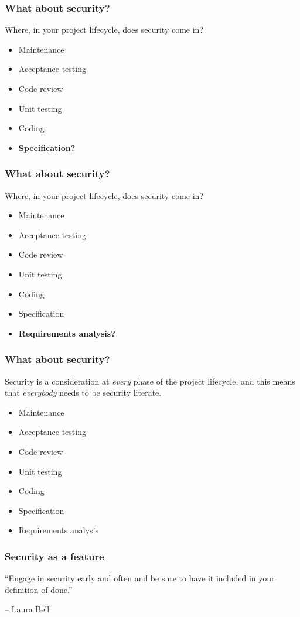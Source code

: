 \documentclass[10pt]{beamer}
\begin{document}
\begin{frame}
	\frametitle{What about security?}

	Where, in your project lifecycle, does security come in?

	\begin{itemize}
		\item Maintenance
		\item Acceptance testing
		\item Code review
		\item Unit testing
		\item Coding
		\item \textbf{Specification?}
	\end{itemize}
\end{frame}
\begin{frame}
	\frametitle{What about security?}

	Where, in your project lifecycle, does security come in?

	\begin{itemize}
		\item Maintenance
		\item Acceptance testing
		\item Code review
		\item Unit testing
		\item Coding
		\item Specification
		\item \textbf{Requirements analysis?}
	\end{itemize}
\end{frame}
\begin{frame}
	\frametitle{What about security?}

	Security is a consideration at \emph{every} phase of the project
	lifecycle, and this means that \emph{everybody} needs to be 
	security literate.
	\begin{itemize}
		\item Maintenance
		\item Acceptance testing
		\item Code review
		\item Unit testing
		\item Coding
		\item Specification
		\item Requirements analysis
	\end{itemize}
\end{frame}
\begin{frame}
    \frametitle{Security as a feature}

    ``Engage in security early and often and be sure to have it included in your definition of done.''

    \vspace{10mm}
    -- Laura Bell
    \end{frame}
\end{document}

